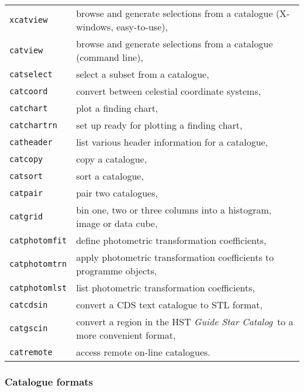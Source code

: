 \documentclass[twoside,11pt]{article}
\renewcommand{\_}{\texttt{\symbol{95}}}
\begin{document}
\begin{tabular}{ll}

{\tt xcatview}     & browse and generate selections from a catalogue 
                     (X-windows, easy-to-use), \\
{\tt catview}      & browse and generate selections from a catalogue 
                     (command line), \\
{\tt catselect}    & select a subset from a catalogue, \\
{\tt catcoord}     & convert between celestial coordinate systems, \\
{\tt catchart}     & plot a finding chart, \\
{\tt catchartrn}   & set up ready for plotting a finding chart, \\
{\tt catheader}    & list various header information for a catalogue, \\
{\tt catcopy}      & copy a catalogue, \\
{\tt catsort}      & sort a catalogue, \\
{\tt catpair}      & pair two catalogues, \\
{\tt catgrid}      & bin one, two or three columns into a histogram,
                     image or data cube, \\
{\tt catphotomfit} & define photometric transformation coefficients, \\
{\tt catphotomtrn} & apply photometric transformation coefficients to
                     programme objects, \\
{\tt catphotomlst} & list photometric transformation coefficients, \\
{\tt catcdsin}     & convert a CDS text catalogue to STL format, \\
{\tt catgscin}     & convert a region in the HST {\it Guide Star Catalog}\,
                     to a more convenient format, \\
{\tt catremote}    & access remote on-line catalogues. \\
\end{tabular}

\subsubsection*{Catalogue formats}
\end{document}
